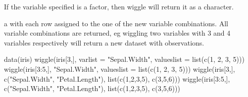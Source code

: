 \documentclass[letterpaper]{book}
\begin{document}
%
\begin{Details}\relax
If the variable specified is a factor, then wiggle will return it
as a character.
\end{Details}
%
\begin{Value}
a  with each row assigned to the one of the new variable combinations.
All variable combinations are returned, eg wiggling two variables with 3 and 4 variables
respectively will return a new dataset with  observations.
\end{Value}
%
\begin{Examples}
\begin{ExampleCode}
data(iris)
wiggle(iris[3,], varlist = "Sepal.Width", valueslist = list(c(1, 2, 3, 5)))
wiggle(iris[3:5,], "Sepal.Width", valueslist = list(c(1, 2, 3, 5)))
wiggle(iris[3,], c("Sepal.Width", "Petal.Length"), list(c(1,2,3,5), c(3,5,6)))
wiggle(iris[3:5,], c("Sepal.Width", "Petal.Length"), list(c(1,2,3,5), c(3,5,6)))
\end{ExampleCode}
\end{Examples}
\printindex{}
\end{document}
